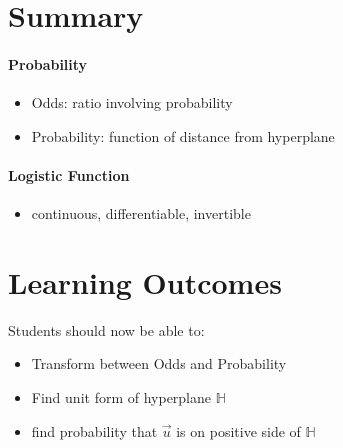 \documentclass[12pt]{book}
\begin{document}
\section*{Summary}
\paragraph{Probability}
\begin{itemize}
        \item Odds: ratio involving probability
        \item Probability: function of distance from hyperplane
\end{itemize}

\paragraph{Logistic Function}
\begin{itemize}
        \item continuous, differentiable, invertible
\end{itemize}

\section*{Learning Outcomes}
Students should now be able to:
\begin{itemize}
        \item Transform between Odds and Probability
        \item Find unit form of hyperplane $\mathbb{H}$
        \item find probability that $\vec u$ is on positive side of $\mathbb{H}$
\end{itemize}
\end{document}
